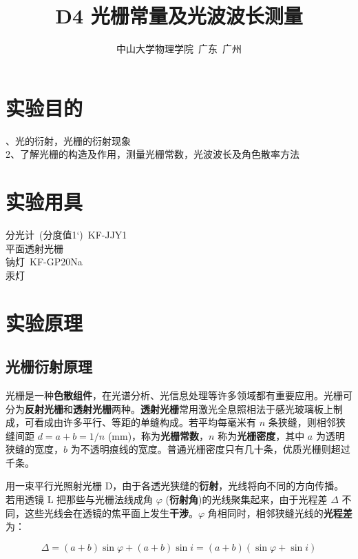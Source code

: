 \documentclass[a4paper,8pt,twocolumn]{article}
\begin{document}
\title{
  \textbf{\huge D4 光栅常量及光波波长测量}}
\author{
\small 中山大学物理学院~广东~广州
}

\maketitle

\section{实验目的}
 、光的衍射，光栅的衍射现象\\
 2、了解光栅的构造及作用，测量光栅常数，光波波长及角色散率方法\\

\section{实验用具}
 \noindent
 分光计~(分度值1‘)~KF-JJY1\\
 平面透射光栅\\
 钠灯~KF-GP20Na\\
 汞灯\\

\section{实验原理}
 \subsection{光栅衍射原理}
  光栅是一种\textbf{色散组件}，在光谱分析、光信息处理等许多领域都有重要应用。光栅可分为\textbf{反射光栅}和\textbf{透射光栅}两种。\textbf{透射光栅}常用激光全息照相法于感光玻璃板上制成，可看成由许多平行、等距的单缝构成。若平均每毫米有 $n$ 条狭缝，则相邻狭缝间距 $d = a+b = 1/n$ ($\text{mm}$)，称为\textbf{光栅常数}，$n$ 称为\textbf{光栅密度}，其中 $a$ 为透明狭缝的宽度，$b$ 为不透明痕线的宽度。普通光栅密度只有几十条，优质光栅则超过千条。

  用一束平行光照射光栅 D，由于各透光狭缝的\textbf{衍射}，光线将向不同的方向传播。若用透镜 L 把那些与光栅法线成角 $\varphi$ (\textbf{衍射角})的光线聚集起来，由于光程差 $\Delta$ 不同，这些光线会在透镜的焦平面上发生\textbf{干涉}。$\varphi$ 角相同时，相邻狭缝光线的\textbf{光程差}为：

  \begin{equation}
    \Delta = (a+b)\sin\varphi + (a+b)\sin i = (a+b)(\sin\varphi + \sin i)
  \end{equation}
\end{document}
